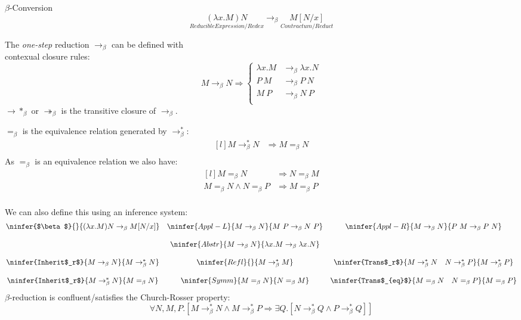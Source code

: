 \begin{definitionbox}{$\beta$-Conversion}
    \[\underset{Reducible Expression/Redex}{(\lambda x . M) N} \to_\beta \underset{Contractum/Reduct}{M[N / x]}\]
    \begin{minipage}{.5\textwidth}
        The \textit{one-step} reduction $\to_\beta$ can be defined with 
        \\ contexual closure rules:
        \[M \to_\beta N \Rightarrow \begin{cases}
            \lambda x. M & \to_\beta \lambda x . N \\
            P \ M & \to_\beta P \ N \\
            M \ P & \to_\beta N \ P \\
        \end{cases}\]
        $\to*_\beta$ or $\twoheadrightarrow_\beta$ is the transitive closure of $\to_\beta$.
    \end{minipage}
    \begin{minipage}{.5\textwidth}
        $=_\beta$ is the equivalence relation generated by $\to^*_\beta$:
        \[\begin{matrix*}[l]
            M \to^*_\beta N & \Rightarrow M =_\beta N \\
        \end{matrix*}\]
        As $=_\beta$ is an equivalence relation we also have:
        \[\begin{matrix*}[l]
            M =_\beta N & \Rightarrow N =_\beta M \\
            M =_\beta N \land N =_\beta P & \Rightarrow M =_\beta P \\
        \end{matrix*}\]
    \end{minipage}
    We can also define this using an inference system:
    \[\begin{matrix}
        \ninfer{$\beta$}{}{(\lambda x . M) N \to_\beta M [N / x]} 
        & \ninfer{Appl-L}{M \to_\beta N}{M \ P \to_\beta N \ P} 
        & \ninfer{Appl-R}{M \to_\beta N}{P \ M \to_\beta P \ N} \\
        \\ 
        & \ninfer{Abstr}{M \to_\beta N}{\lambda x . M \to_\beta \lambda x . N} \\
        \\
        \ninfer{Inherit$_r$}{M \to_\beta N}{M \to^*_\beta N} 
        & \ninfer{Refl}{}{M \to^*_\beta M} 
        & \ninfer{Trans$_r$}{M \to^*_\beta N \quad N \to^*_\beta P}{M \to^*_\beta P} \\
        \\
        \ninfer{Inherit$_r$}{M \to^*_\beta N}{M =_\beta N}
        & \ninfer{Symm}{M =_\beta N}{N =_\beta M} 
        & \ninfer{Trans$_{eq}$}{M =_\beta N \quad N =_\beta P}{M =_\beta P} \\
    \end{matrix}\]
    $\beta$-reduction is confluent/satisfies the Church-Rosser property:
    \[\forall N, M, P . [M \to^*_\beta N \land M \to^*_\beta P \Rightarrow \exists Q . [N \to^*_\beta Q \land P \to^*_\beta Q] ] \]
\end{definitionbox}
